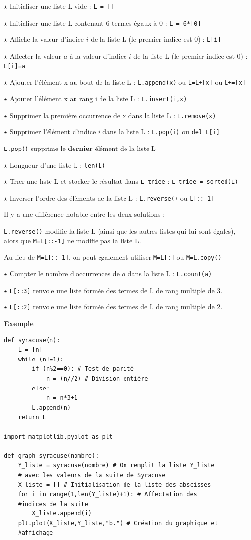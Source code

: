 $\star$ Initialiser une liste L vide : \verb!L = []!

$\star$ Initialiser une liste L contenant 6 termes égaux à 0 : \verb!L = 6*[0]!

$\star$ Affiche la valeur d'indice $i$ de la liste L (le premier indice est 0) :
\verb!L[i]!

$\star$ Affecter la valeur $a$ à la valeur d'indice $i$ de la liste L (le premier indice est 0) :
\verb!L[i]=a!

$\star$ Ajouter l'élément x au bout de la liste L :
\verb!L.append(x)! ou \verb~L=L+[x]~ ou \verb~L+=[x]~

$\star$ Ajouter l'élément x au rang i de la liste L :
\verb!L.insert(i,x)!

$\star$ Supprimer la première occurrence de x dans la
liste L : \verb!L.remove(x)!

$\star$ Supprimer l'élément d'indice $i$ dans la liste L :
\verb!L.pop(i)! ou \verb!del L[i]!

\verb~L.pop()~ supprime le \textbf{dernier} élément de la liste L

$\star$ Longueur d'une liste L :
\verb!len(L)!

$\star$ Trier une liste L et stocker le résultat dans
\verb!L_triee! :
\verb!L_triee = sorted(L)!

$\star$ Inverser l'ordre des éléments de la liste L :
\verb!L.reverse()! ou  \verb~L[::-1]~

\danger Il y a une différence notable entre les deux solutions :

\verb!L.reverse()! modifie la liste L (ainsi que les autres listes qui lui sont égales), alors que
\verb~M=L[::-1]~ ne modifie pas la liste L.

Au lieu de \verb!M=L[::-1]!, on peut également utiliser 
\verb!M=L[:]! ou \verb!M=L.copy()!

$\star$ Compter le nombre d'occurrences de $a$ dans la liste L :
\verb!L.count(a)!

$\star$ \verb!L[::3]! renvoie une liste formée des termes de L de rang multiple de 3.

$\star$ \verb!L[::2]! renvoie une liste formée des termes de L de rang multiple de 2.

\medskip

\textbf{\large Exemple}

\begin{lstlisting}
def syracuse(n):
    L = [n]
    while (n!=1):
        if (n%2==0): # Test de parité
            n = (n//2) # Division entière
        else:
            n = n*3+1
        L.append(n)
    return L

import matplotlib.pyplot as plt

def graph_syracuse(nombre):
    Y_liste = syracuse(nombre) # On remplit la liste Y_liste
    # avec les valeurs de la suite de Syracuse
    X_liste = [] # Initialisation de la liste des abscisses
    for i in range(1,len(Y_liste)+1): # Affectation des 
    #indices de la suite
        X_liste.append(i)
    plt.plot(X_liste,Y_liste,"b.") # Création du graphique et 
    #affichage
\end{lstlisting}

